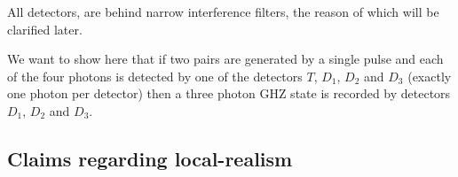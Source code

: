 All detectors, are behind narrow interference filters, the reason of which will be clarified later.

We want to show here that if two pairs are generated by a single pulse and each of the four photons is detected by one of the detectors $T$, $D_1$, $D_2$ and $D_3$ (exactly one photon per detector) then a three photon GHZ state is recorded by detectors $D_1$, $D_2$ and $D_3$.%

\subsection{Claims regarding local-realism}
